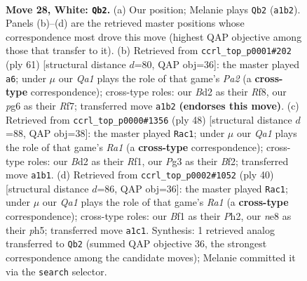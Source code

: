 \documentclass[11pt]{article}
\begin{document}
\clearpage

\begin{figure}[p]\centering
\begin{subfigure}{0.46\textwidth}\centering
\resizebox{\linewidth}{!}{%
\newchessgame
\chessboard[
  setfen={1r1rn1k1/p1p2p2/6p1/2Pp1q1p/5P2/1P2P1P1/3BR2P/Q3KBR1 w - - 2 28},
  showmover=false,
  pgfstyle=straightmove, color=movearrow, markmove={a1-b2}
]}
\caption{}
\end{subfigure}\hfill
\begin{subfigure}{0.46\textwidth}\centering
\resizebox{\linewidth}{!}{%
\newchessgame
\chessboard[
  setfen={5r1k/p1pq1rbp/1p6/3Ppp2/2P5/1PNQ2P1/P4R1P/5R1K b - - 11 31},
  showmover=false,
  pgfstyle=straightmove, color=movearrow, markmove={a7-a6}
]}
\caption{}
\end{subfigure}
\\[4pt]
\begin{subfigure}{0.46\textwidth}\centering
\resizebox{\linewidth}{!}{%
\newchessgame
\chessboard[
  setfen={2r3k1/1p4pp/p2npr2/3q4/Pb1PpP2/6P1/1P2QBBP/R4R1K w - - 6 25},
  showmover=false,
  pgfstyle=straightmove, color=movearrow, markmove={a1-c1}
]}
\caption{}
\end{subfigure}\hfill
\begin{subfigure}{0.46\textwidth}\centering
\resizebox{\linewidth}{!}{%
\newchessgame
\chessboard[
  setfen={1rr3k1/1p1n1pp1/p2p1q2/Q2Pp2p/1PP5/5P2/P4BPP/R4RK1 w - - 1 21},
  showmover=false,
  pgfstyle=straightmove, color=movearrow, markmove={a1-c1}
]}
\caption{}
\end{subfigure}
\caption{\textbf{Move 28, White: \texttt{Qb2}.} (a) Our position; Melanie plays \texttt{Qb2} (\texttt{a1b2}). Panels (b)--(d) are the retrieved master positions whose correspondence most drove this move (highest QAP objective among those that transfer to it). (b) Retrieved from \texttt{ccrl\_top\_p0001\#202} (ply 61) [structural distance $d$=80, QAP obj=36]: the master played \texttt{a6}; under $\mu$ our \emph{Qa1} plays the role of that game's \emph{Pa2} (a \textbf{cross-type} correspondence); cross-type roles: our \emph{B}d2 as their \emph{R}f8, our \emph{p}g6 as their \emph{R}f7; transferred move \texttt{a1b2} \textbf{(endorses this move)}. (c) Retrieved from \texttt{ccrl\_top\_p0000\#1356} (ply 48) [structural distance $d$=88, QAP obj=38]: the master played \texttt{Rac1}; under $\mu$ our \emph{Qa1} plays the role of that game's \emph{Ra1} (a \textbf{cross-type} correspondence); cross-type roles: our \emph{B}d2 as their \emph{R}f1, our \emph{P}g3 as their \emph{B}f2; transferred move \texttt{a1b1}. (d) Retrieved from \texttt{ccrl\_top\_p0002\#1052} (ply 40) [structural distance $d$=86, QAP obj=36]: the master played \texttt{Rac1}; under $\mu$ our \emph{Qa1} plays the role of that game's \emph{Ra1} (a \textbf{cross-type} correspondence); cross-type roles: our \emph{B}f1 as their \emph{P}h2, our \emph{n}e8 as their \emph{p}h5; transferred move \texttt{a1c1}. Synthesis: 1 retrieved analog transferred to \texttt{Qb2} (summed QAP objective 36, the strongest correspondence among the candidate moves); Melanie committed it via the \texttt{search} selector.}
\label{fig:thought-m54}
\end{figure}
\end{document}
